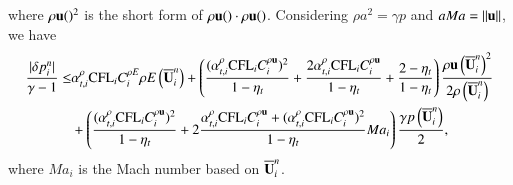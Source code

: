 where $\rho\mathbf{u}()^2$ is the short form of $\rho\mathbf{u}()\cdot\rho\mathbf{u}()$.
Considering $\rho a^2=\gamma p$ and $aMa=\|\mathbf{u}\|$, we have
\begin{equation}
    \begin{aligned}
        \dfrac{|\delta p_i^n|}{\gamma-1} 
        \leq & \alpha_{t,i}^\rho\text{CFL}_i C^{\rho E}_i  \rho E\left( \overline{\mathbf{U}}^n_i \right) 
        +\left(
        \frac{(\alpha_{t,i}^\rho\text{CFL}_i C^{\rho \mathbf{u}}_i)^2}{1-\eta_t}
        +\frac{2\alpha_{t,i}^\rho\text{CFL}_i C^{\rho \mathbf{u}}_i}{1-\eta_t}
        + \frac{2-\eta_t}{1-\eta_t}
        \right)
        \frac{ \rho\mathbf{u}\left(\overline{\mathbf{U}}^n_i\right)^2}{2\rho\left(\overline{\mathbf{U}}^n_i\right)}
        \\  & +
        \left(
        \frac{(\alpha_{t,i}^\rho\text{CFL}_i C^{\rho \mathbf{u}}_i)^2}
        {1-\eta_t}
        +
        2 
        \frac{\alpha_{t,i}^\rho\text{CFL}_i C^{\rho \mathbf{u}}_i + (\alpha_{t,i}^\rho\text{CFL}_i C^{\rho \mathbf{u}}_i)^2
       }
       {1-\eta_t}Ma_i
        \right)
        \frac{\gamma p\left(\overline{\mathbf{U}}^n_i\right)}{2}
        ,
    \end{aligned}
\end{equation}
where $Ma_i$ is the Mach number based on $\overline{\mathbf{U}}^n_i$. 

